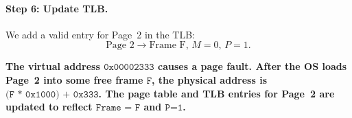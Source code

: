 \documentclass{article}
\begin{document}
\paragraph{Step 6: Update TLB.}
We add a valid entry for Page~2 in the TLB:
\[
\text{Page~2} \longrightarrow \text{Frame~F},\, M=0,\, P=1.
\]

\textbf{The virtual address \(\texttt{0x00002333}\) causes a page
fault. After the OS loads Page~2 into some free frame \(\texttt{F}\),
the physical address is \(\texttt{(F * 0x1000) + 0x333}\). The page
table and TLB entries for Page~2 are updated to reflect
\(\texttt{Frame = F}\) and \(\texttt{P=1}\).}



\newpage


\end{document}
